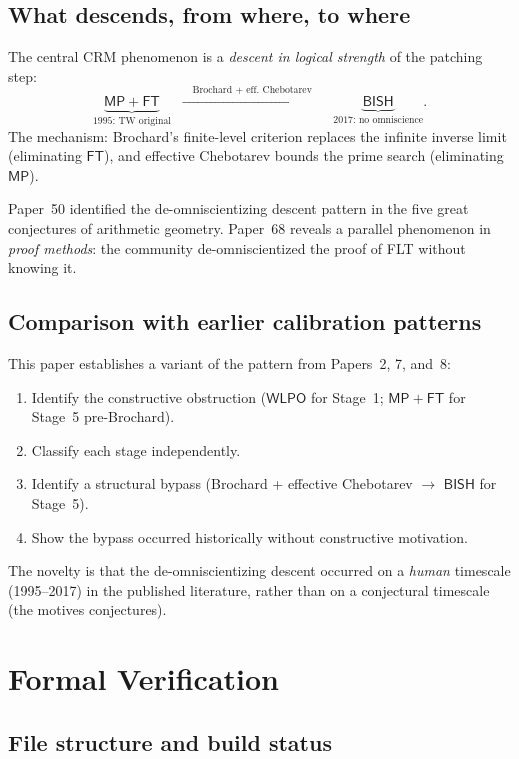 \documentclass[11pt]{article}
\theoremstyle{plain}
\theoremstyle{definition}
\theoremstyle{remark}
\newcommand{\CRM}{\mathrm{CRM}}
\newcommand{\BISH}{\mathsf{BISH}}
\newcommand{\WLPO}{\mathsf{WLPO}}
\newcommand{\MP}{\mathsf{MP}}
\newcommand{\FT}{\mathsf{FT}}
\begin{document}
\subsection{What descends, from where, to where}

The central $\CRM$ phenomenon is a \emph{descent in logical
strength} of the patching step:
\[
\underbrace{\MP + \FT}_{\text{1995: TW original}} \;\;\xrightarrow{\quad\text{Brochard + eff.\ Chebotarev}\quad}\;\; \underbrace{\BISH}_{\text{2017: no omniscience}}.
\]
The mechanism: Brochard's finite-level criterion replaces the
infinite inverse limit (eliminating $\FT$), and effective Chebotarev
bounds the prime search (eliminating $\MP$).

Paper~50 \cite{Paper50} identified the de-omniscientizing descent
pattern in the five great conjectures of arithmetic geometry.
Paper~68 reveals a parallel phenomenon in \emph{proof methods}:
the community de-omniscientized the proof of FLT without knowing it.

\subsection{Comparison with earlier calibration patterns}

This paper establishes a variant of the pattern from Papers~2, 7,
and~8:
\begin{enumerate}[nosep]
\item Identify the constructive obstruction ($\WLPO$ for Stage~1;
  $\MP + \FT$ for Stage~5 pre-Brochard).
\item Classify each stage independently.
\item Identify a structural bypass (Brochard + effective Chebotarev
  $\to$ $\BISH$ for Stage~5).
\item Show the bypass occurred historically without constructive motivation.
\end{enumerate}
The novelty is that the de-omniscientizing descent occurred on a
\emph{human} timescale (1995--2017) in the published literature,
rather than on a conjectural timescale (the motives conjectures).


\section{Formal Verification}\label{sec:formal}

\subsection{File structure and build status}
\end{document}
